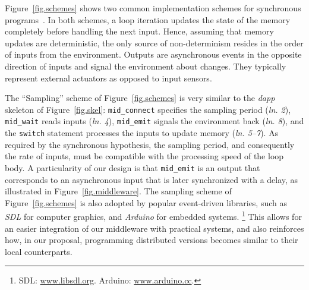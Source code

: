 \documentclass[sigplan,screen]{acmart}
\newcommand{\lin}[1]{(\emph{ln. #1}\xspace)}
\newcommand{\dapp}{\emph{dapp}\xspace}
\begin{document}
Figure~\ref{fig.schemes} shows two common implementation schemes for
synchronous programs~\cite{schemes}.
In both schemes, a loop iteration updates the state of the memory completely
before handling the next input.
Hence, assuming that memory updates are deterministic, the only source of
non-determinism resides in the order of inputs from the environment.
Outputs are asynchronous events in the opposite direction of inputs and
signal the environment about changes.
They typically represent external actuators as opposed to input sensors.

The ``Sampling'' scheme of Figure~\ref{fig.schemes} is very similar to the
\dapp skeleton of Figure~\ref{fig.skel}:
    \texttt{mid\_connect} specifies the sampling period \lin{2},
    \texttt{mid\_wait} reads inputs \lin{4},
    \texttt{mid\_emit} signals the environment back \lin{8}, and
    the \texttt{switch} statement processes the inputs to update memory \lin{5--7}.
As required by the synchronous hypothesis, the sampling period, and
consequently the rate of inputs, must be compatible with the processing speed
of the loop body.
A particularity of our design is that \texttt{mid\_emit} is an output that
corresponds to an asynchronous input that is later synchronized with a delay,
as illustrated in Figure~\ref{fig.middleware}.
%
The sampling scheme of Figure~\ref{fig.schemes} is also adopted by popular
event-driven libraries, such as \emph{SDL} for computer graphics, and
\emph{Arduino} for embedded systems.%
\footnote{SDL: \url{www.libsdl.org}. Arduino: \url{www.arduino.cc}.}
This allows for an easier integration of our middleware with practical systems,
and also reinforces how, in our proposal, programming distributed versions
becomes similar to their local counterparts.
\end{document}
